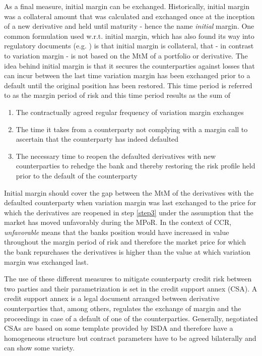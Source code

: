 \documentclass[../Thesis_AHoecherl.tex]{subfiles}
\begin{document}
As a final measure, initial margin can be exchanged. Historically, initial margin was a collateral amount that was calculated and exchanged once at the inception of a new derivative and held until maturity - hence the name \emph{initial} margin. One common formulation used w.r.t. initial margin, which has also found its way into regulatory documents (e.g. \cite[Article 52.16]{CRE52}) is that initial margin is collateral, that - in contrast to variation margin - is not based on the \gls{MtM} of a portfolio or derivative. The idea behind initial margin is that it secures the counterparties against losses that can incur between the last time variation margin has been exchanged prior to a default until the original position has been restored. This time period is referred to as the margin period of risk and this time period results as the sum of
\begin{enumerate}
    \item The contractually agreed regular frequency of variation margin exchanges
    \item The time it takes from a counterparty not complying with a margin call to ascertain that the counterparty has indeed defaulted
    \item The necessary time to reopen the defaulted derivatives with new counterparties to rehedge the bank and thereby restoring the risk profile held prior to the default of the counterparty\label{step3}
\end{enumerate}
Initial margin should cover the gap between the \gls{MtM} of the derivatives with the defaulted counterparty when variation margin was last exchanged to the price for which the derivatives are reopened in step \ref{step3} under the assumption that the market has moved unfavorably during the \gls{MPoR}. In the context of CCR, \emph{unfavorable} means that the banks position would have increased in value throughout the margin period of risk and therefore the market price for which the bank repurchases the derivatives is higher than the value at which variation margin was exchanged last.

The use of these different measures to mitigate counterparty credit risk between two parties and their parametrization is set in the credit support annex (\gls{CSA}). 
A credit support annex is a legal document arranged between derivative counterparties that, among others, regulates the exchange of margin and the proceedings in case of a default of one of the counterparties.
Generally, negotiated CSAs are based on some template provided by \gls{ISDA} and therefore have a homogeneous structure but contract parameters have to be agreed bilaterally and can show some variety.
\end{document}
